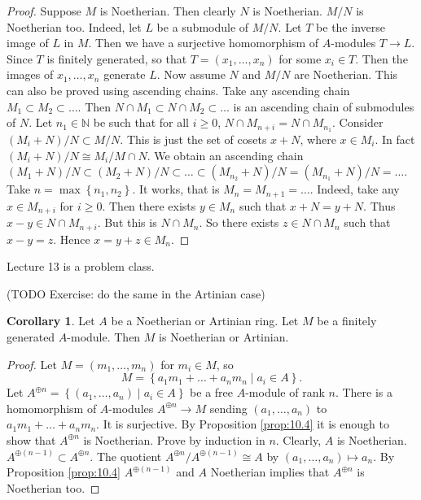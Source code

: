\documentclass{article}
\newcommand{\N}{\mathbb{N}}
\newcommand{\rb}[1]{\left( #1 \right)}
\newcommand{\cb}[1]{\left\{ #1 \right\}}
\theoremstyle{definition}\newtheorem{definition}{Definition}[section]
\theoremstyle{definition}\newtheorem{remark}[definition]{Remark}
\theoremstyle{definition}\newtheorem*{example}{Example}
\theoremstyle{definition}\newtheorem*{note}{Note}
\newtheorem{corollary}[definition]{Corollary}
\begin{document}
\begin{proof}
Suppose $ M $ is Noetherian. Then clearly $ N $ is Noetherian. $ M / N $ is Noetherian too. Indeed, let $ L $ be a submodule of $ M / N $. Let $ T $ be the inverse image of $ L $ in $ M $. Then we have a surjective homomorphism of $ A $-modules $ T \to L $. Since $ T $ is finitely generated, so that $ T = \rb{x_1, \dots, x_n} $ for some $ x_i \in T $. Then the images of $ x_1, \dots, x_n $ generate $ L $. Now assume $ N $ and $ M / N $ are Noetherian. This can also be proved using ascending chains. Take any ascending chain $ M_1 \subset M_2 \subset \dots $. Then $ N \cap M_1 \subset N \cap M_2 \subset \dots $ is an ascending chain of submodules of $ N $. Let $ n_1 \in \N $ be such that for all $ i \ge 0 $, $ N \cap M_{n + i} = N \cap M_{n_1} $. Consider $ \rb{M_i + N} / N \subset M / N $. This is just the set of cosets $ x + N $, where $ x \in M_i $. In fact $ \rb{M_i + N} / N \cong M_i / M \cap N $. We obtain an ascending chain $ \rb{M_1 + N} / N \subset \rb{M_2 + N} / N \subset \dots \subset \rb{M_{n_2} + N} / N = \rb{M_{n_1} + N} / N = \dots $. Take $ n = \max\cb{n_1, n_2} $. It works, that is $ M_n = M_{n + 1} = \dots $. Indeed, take any $ x \in M_{n + i} $ for $ i \ge 0 $. Then there exists $ y \in M_n $ such that $ x + N = y + N $. Thus $ x - y \in N \cap M_{n + i} $. But this is $ N \cap M_n $. So there exists $ z \in N \cap M_n $ such that $ x - y = z $. Hence $ x = y + z \in M_n $.
\end{proof}


Lecture 13 is a problem class.


(TODO Exercise: do the same in the Artinian case)

\begin{corollary}
Let $ A $ be a Noetherian or Artinian ring. Let $ M $ be a finitely generated $ A $-module. Then $ M $ is Noetherian or Artinian.
\end{corollary}

\begin{proof}
Let $ M = \rb{m_1, \dots, m_n} $ for $ m_i \in M $, so
$$ M = \cb{a_1m_1 + \dots + a_nm_n \mid a_i \in A}. $$
Let $ A^{\oplus n} = \cb{\rb{a_1, \dots, a_n} \mid a_i \in A} $ be a free $ A $-module of rank $ n $. There is a homomorphism of $ A $-modules $ A^{\oplus n} \to M $ sending $ \rb{a_1, \dots, a_n} $ to $ a_1m_1 + \dots + a_nm_n $. It is surjective. By Proposition \ref{prop:10.4} it is enough to show that $ A^{\oplus n} $ is Noetherian. Prove by induction in $ n $. Clearly, $ A $ is Noetherian. $ A^{\oplus \rb{n - 1}} \subset A^{\oplus n} $. The quotient $ A^{\oplus n} / A^{\oplus \rb{n - 1}} \cong A $ by $ \rb{a_1, \dots, a_n} \mapsto a_n $. By Proposition \ref{prop:10.4} $ A^{\oplus \rb{n - 1}} $ and $ A $ Noetherian implies that $ A^{\oplus n} $ is Noetherian too.
\end{proof}
\end{document}
